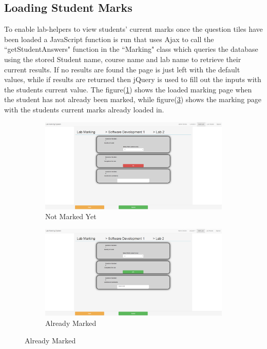 \documentclass[11pt]{report}
\begin{document}
\subsection{Loading Student Marks}

To enable lab-helpers to view students' current marks once the question tiles have been loaded a JavaScript function is run that uses Ajax to call the ``getStudentAnswers" function in the ``Marking" class which queries the database using the stored Student name, course name and lab name to retrieve their current results. If no results are found the page is just left with the default values, while if results are returned then jQuery is used to fill out the inputs with the students current value. The figure(\ref{fig:marking-not}) shows the loaded marking page when the student has not already been marked, while figure(\ref{fig:marking-already}) shows the marking page with the students current marks already loaded in.

\begin{figure}[H]
\caption{Marking Student Page}
\centering
\begin{subfigure}[c]{0.45\textwidth}
    \includegraphics[width=1\textwidth]{images/implementation/marking-5-page.png}
    \caption{Not Marked Yet}
    \label{fig:marking-not}
\end{subfigure}
\hfill
\begin{subfigure}[c]{0.45\textwidth}
    \includegraphics[width=1\textwidth]{images/implementation/marking-6-page.png}
    \caption{Already Marked}
    \label{fig:marking-already}
\end{subfigure}

\end{figure}
\end{document}

